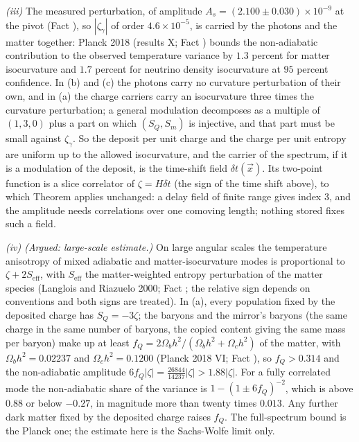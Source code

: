 \emph{(iii)} The measured perturbation, of amplitude $A_{s} = (2.100 \pm 0.030) \times 10^{-9}$ at the pivot (Fact ), so $|\zeta_{\gamma}|$ of order $4.6 \times 10^{-5}$, is carried by the photons and the matter together: Planck 2018 (results X; Fact ) bounds the non-adiabatic contribution to the observed temperature variance by $1.3$ percent for matter isocurvature and $1.7$ percent for neutrino density isocurvature at $95$ percent confidence. In (b) and (c) the photons carry no curvature perturbation of their own, and in (a) the charge carriers carry an isocurvature three times the curvature perturbation; a general modulation decomposes as a multiple of $(1, 3, 0)$ plus a part on which $(S_{Q}, S_{m})$ is injective, and that part must be small against $\zeta_{\gamma}$. So the deposit per unit charge and the charge per unit entropy are uniform up to the allowed isocurvature, and the carrier of the spectrum, if it is a modulation of the deposit, is the time-shift field $\delta t(\vec x)$. Its two-point function is a slice correlator of $\zeta = H\delta t$ (the sign of the time shift above), to which Theorem  applies unchanged: a delay field of finite range gives index $3$, and the amplitude needs correlations over one comoving length; nothing stored fixes such a field.

\emph{(iv) (Argued: large-scale estimate.)} On large angular scales the temperature anisotropy of mixed adiabatic and matter-isocurvature modes is proportional to $\zeta + 2S_{\mathrm{eff}}$, with $S_{\mathrm{eff}}$ the matter-weighted entropy perturbation of the matter species (Langlois and Riazuelo 2000; Fact ; the relative sign depends on conventions and both signs are treated). In (a), every population fixed by the deposited charge has $S_{Q} = -3\zeta$; the baryons and the mirror's baryons (the same charge in the same number of baryons, the copied content giving the same mass per baryon) make up at least $f_{Q} = 2\Omega_{b}h^{2}/(\Omega_{b}h^{2} + \Omega_{c}h^{2})$ of the matter, with $\Omega_{b}h^{2} = 0.02237$ and $\Omega_{c}h^{2} = 0.1200$ (Planck 2018 VI; Fact ), so $f_{Q} > 0.314$ and the non-adiabatic amplitude $6f_{Q}|\zeta| = \tfrac{26844}{14237}|\zeta| > 1.88|\zeta|$. For a fully correlated mode the non-adiabatic share of the variance is $1 - (1 \pm 6f_{Q})^{-2}$, which is above $0.88$ or below $-0.27$, in magnitude more than twenty times $0.013$. Any further dark matter fixed by the deposited charge raises $f_{Q}$. The full-spectrum bound is the Planck one; the estimate here is the Sachs-Wolfe limit only.
